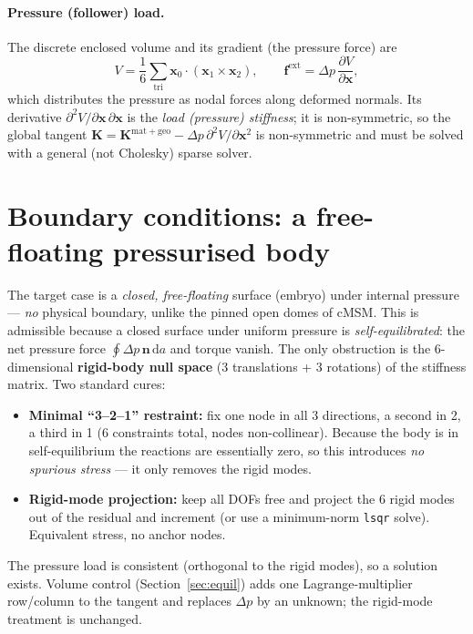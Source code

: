 \documentclass[11pt]{article}
\newcommand{\vv}[1]{\bm{#1}}          %
\newcommand{\nn}{\vv{n}}               %
\newcommand{\xx}{\vv{x}}               %
\newcommand{\dd}{\,\mathrm{d}}
\begin{document}
\paragraph{Pressure (follower) load.} The discrete enclosed volume and its gradient
(the pressure force) are
\begin{equation}
  V=\frac{1}{6}\sum_{\text{tri}}\xx_0\cdot(\xx_1\times\xx_2),\qquad
  \vv f^{\mathrm{ext}}=\Delta p\,\frac{\partial V}{\partial\xx},
\end{equation}
which distributes the pressure as nodal forces along deformed normals. Its derivative
$\partial^2 V/\partial\xx\,\partial\xx$ is the \emph{load (pressure) stiffness}; it is
non-symmetric, so the global tangent
$\vv K=\vv K^{\mathrm{mat+geo}}-\Delta p\,\partial^2 V/\partial\xx^2$ is non-symmetric and
must be solved with a general (not Cholesky) sparse solver.

\section{Boundary conditions: a free-floating pressurised body}
\label{sec:bc}

The target case is a \emph{closed, free-floating} surface (embryo) under internal
pressure --- \emph{no} physical boundary, unlike the pinned open domes of cMSM. This is
admissible because a closed surface under uniform pressure is \emph{self-equilibrated}:
the net pressure force $\oint\Delta p\,\nn\dd a$ and torque vanish. The only obstruction
is the 6-dimensional \textbf{rigid-body null space} (3 translations + 3 rotations) of the
stiffness matrix. Two standard cures:
\begin{itemize}[nosep]
  \item \textbf{Minimal ``3--2--1'' restraint:} fix one node in all 3 directions, a
        second in 2, a third in 1 (6 constraints total, nodes non-collinear). Because the
        body is in self-equilibrium the reactions are essentially zero, so this introduces
        \emph{no spurious stress} --- it only removes the rigid modes.
  \item \textbf{Rigid-mode projection:} keep all DOFs free and project the 6 rigid modes
        out of the residual and increment (or use a minimum-norm \texttt{lsqr} solve).
        Equivalent stress, no anchor nodes.
\end{itemize}
The pressure load is consistent (orthogonal to the rigid modes), so a solution exists.
Volume control (Section~\ref{sec:equil}) adds one Lagrange-multiplier row/column to the
tangent and replaces $\Delta p$ by an unknown; the rigid-mode treatment is unchanged.
\end{document}
